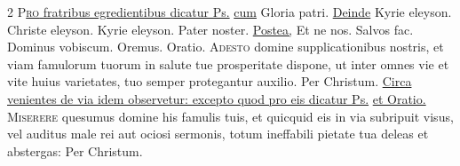 \begin{multicols}{2}
{\color{Red} }
\lettrine[lines=2]{\zallmancaps \color{Red} P}{}\ul{\textsc{ro} fratribus egredientibus dicatur Ps.}  \ul{cum} Gloria patri. \ul{Deinde} Kyrie eleyson. Christe eleyson. Kyrie eleyson. Pater noster. \ul{Postea,} Et ne nos. \V Salvos fac. Dominus vobiscum. Oremus. {\color{Red} Oratio.}
\lettrine[lines=2]{\zallmancaps \color{Blue} A}{desto} domine supplicationibus nostris, et viam famulorum tuorum in salute tue prosperitate dispone, ut inter omnes vie et vite huius varietates, tuo semper protegantur auxilio. Per Christum.
\newline \ul{Circa venientes de via idem observetur: excepto quod pro eis dicatur Ps.}  \ul{et Oratio.}
\lettrine[lines=2]{\zallmancaps \color{Blue} M}{iserere} quesumus domine his famulis tuis, et quicquid eis in via subripuit visus, vel auditus male rei aut ociosi sermonis, totum ineffabili pietate tua deleas et abstergas: Per Christum.


\end{multicols}
